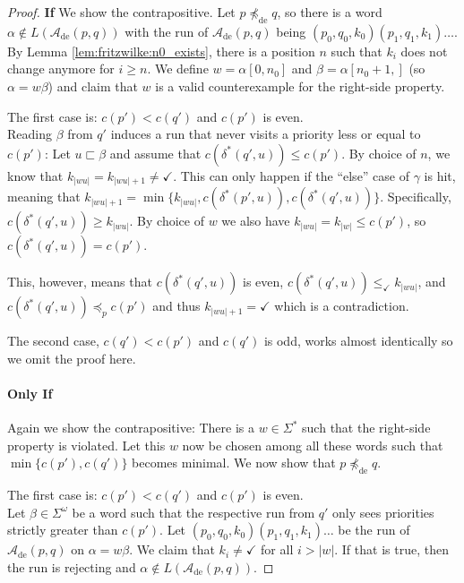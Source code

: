 \begin{proof} %
	\textbf{If} We show the contrapositive. Let $p \not\preceq_\text{de} q$, so there is a word $\alpha \notin L(\mathcal{A}_\text{de}(p, q))$ with the run of $\mathcal{A}_\text{de}(p, q)$ being $(p_0, q_0, k_0) (p_1, q_1, k_1) \dots$. By Lemma \ref{lem:fritzwilke:n0_exists}, there is a position $n$ such that $k_i$ does not change anymore for $i \geq n$. We define $w = \alpha[0, n_0]$ and $\beta = \alpha[n_0+1, ]$ (so $\alpha = w\beta$) and claim that $w$ is a valid counterexample for the right-side property.
	
	The first case is: $c(p') < c(q')$ and $c(p')$ is even. \\
	Reading $\beta$ from $q'$ induces a run that never visits a priority less or equal to $c(p')$: Let $u \sqsubset \beta$ and assume that $c(\delta^*(q', u)) \leq c(p')$. By choice of $n$, we know that $k_{|wu|} = k_{|wu|+1} \neq \checkmark$. This can only happen if the \enquote{else} case of $\gamma$ is hit, meaning that $k_{|wu|+1} = \min \{ k_{|wu|}, c(\delta^*(p', u)), c(\delta^*(q', u)) \}$. Specifically, $c(\delta^*(q', u)) \geq k_{|wu|}$. By choice of $w$ we also have $k_{|wu|} = k_{|w|} \leq c(p')$, so $c(\delta^*(q', u)) = c(p')$.
	
	This, however, means that $c(\delta^*(q', u))$ is even, $c(\delta^*(q', u)) \leq_\checkmark k_{|wu|}$, and $c(\delta^*(q', u)) \preceq_p c(p')$ and thus $k_{|wu|+1} = \checkmark$ which is a contradiction.
	
	The second case, $c(q') < c(p')$ and $c(q')$ is odd, works almost identically so we omit the proof here.
	
	\paragraph{Only If} Again we show the contrapositive: There is a $w \in \Sigma^*$ such that the right-side property is violated. Let this $w$ now be chosen among all these words such that $\min \{ c(p'), c(q') \}$ becomes minimal. We now show that $p \not\preceq_\text{de} q$. 
	
	The first case is: $c(p') < c(q')$ and $c(p')$ is even. \\
	Let $\beta \in \Sigma^\omega$ be a word such that the respective run from $q'$ only sees priorities strictly greater than $c(p')$. Let $(p_0, q_0, k_0) (p_1, q_1, k_1) \dots$ be the run of $\mathcal{A}_\text{de}(p, q)$ on $\alpha = w \beta$. We claim that $k_i \neq \checkmark$ for all $i > |w|$. If that is true, then the run is rejecting and $\alpha \notin L(\mathcal{A}_\text{de}(p, q))$.
	

\end{proof}

